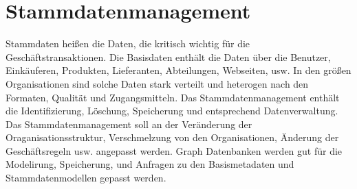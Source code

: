 \section{Stammdatenmanagement}
Stammdaten heißen die Daten, die kritisch wichtig für die Geschäftstransaktionen. Die Basisdaten enthält die Daten über die Benutzer, Einkäuferen, Produkten, Lieferanten, Abteilungen, Webseiten, usw. In den größen Organisationen sind solche Daten stark verteilt und heterogen nach den Formaten, Qualität und Zugangsmitteln. Das Stammdatenmanagement enthält die Identifizierung, Löschung, Speicherung und entsprechend Datenverwaltung. Das Stammdatenmanagement soll an der Veränderung der Oraganisationsstruktur, Verschmelzung von den Organisationen, Änderung der Geschäftsregeln usw. angepasst werden.\cite[p.~110]{GraphDB} Graph Datenbanken werden gut für die Modelirung, Speicherung, und Anfragen zu den Basismetadaten und Stammdatenmodellen gepasst werden. 
